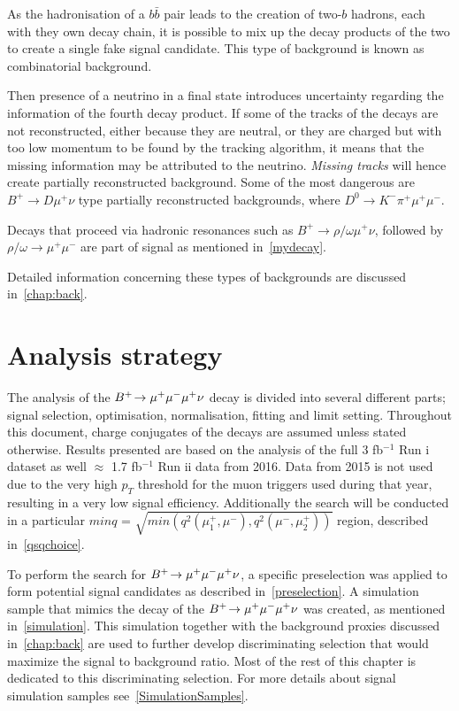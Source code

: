 As the hadronisation of a $b\bar{b}$ pair leads to the creation of two-$b$ hadrons, each with they own decay chain, it is possible to mix up the decay products of the two to create a single fake signal candidate. This type of background is known as combinatorial background.

Then presence of a neutrino in a final state introduces uncertainty regarding the information of the fourth decay product. If some of the tracks of the decays are not reconstructed, either because they are neutral, or they are charged but with too low momentum to be found by the tracking algorithm, it means that the missing information may be attributed to the neutrino. \textit{Missing tracks} will hence create partially reconstructed background. Some of the most dangerous are ${B^{+} \rightarrow D \mu^{+} \nu}$ type partially reconstructed backgrounds, where $D^0 \rightarrow K^- \pi^+ \mu^{+} \mu^{-}$.

Decays that proceed via hadronic resonances such as $B^{+} \rightarrow \rho/\omega \mu^{+} \nu$, followed by $\rho/\omega \rightarrow \mu^{+} \mu^{-}$ are part of signal as mentioned in~\autoref{mydecay}.

Detailed information concerning these types of backgrounds are discussed in~\autoref{chap:back}.

\section{Analysis strategy}
\label{Strategy}

The analysis of the ${{{B}^+}}\!\rightarrow {\ensuremath{\mu^+\mu^-\mu^+}}\nu$ decay is divided into several different parts; signal selection, optimisation, normalisation, fitting and limit setting. Throughout this document, charge conjugates of the decays are assumed unless stated otherwise. Results presented are based on the analysis of the full 3 fb$^{-1}$ Run \Rn{1} dataset as well $\approx$ 1.7 fb$^{-1}$ Run \Rn{2} data from 2016. Data from 2015 is not used due to the very high $p_{T}$ threshold for the muon triggers used during that year, resulting in a very low signal efficiency. Additionally the search will be conducted in a particular $minq$ = $\sqrt{min(q^{2}(\mu_{1}^{+},\mu^{-}), q^2(\mu^{-},\mu_{2}^{+}))}$ region, described in~\autoref{qsqchoice}.  


To perform the search for ${{{B}^+}}\!\rightarrow {\ensuremath{\mu^+\mu^-\mu^+}}\nu$, a specific preselection was applied to form potential signal candidates as described in~\autoref{preselection}. A simulation sample that mimics the decay of the ${{{B}^+}}\!\rightarrow {\ensuremath{\mu^+\mu^-\mu^+}}\nu$ was created, as mentioned in~\autoref{simulation}. This simulation together with the background proxies discussed in~\autoref{chap:back} are used to further develop discriminating selection that would maximize the signal to background ratio. Most of the rest of this chapter is dedicated to this discriminating selection. For more details about signal simulation samples see~\autoref{SimulationSamples}.


